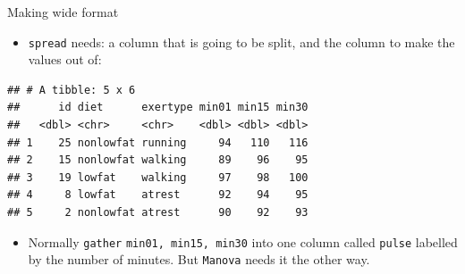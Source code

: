 \documentclass[ignorenonframetext,]{beamer}
\newenvironment{Shaded}{\begin{snugshade}}{\end{snugshade}}
\newcommand{\DecValTok}[1]{\textcolor[rgb]{0.00,0.00,0.81}{#1}}
\newcommand{\KeywordTok}[1]{\textcolor[rgb]{0.13,0.29,0.53}{\textbf{#1}}}
\newcommand{\NormalTok}[1]{#1}
\newcommand{\OperatorTok}[1]{\textcolor[rgb]{0.81,0.36,0.00}{\textbf{#1}}}
\newcommand{\StringTok}[1]{\textcolor[rgb]{0.31,0.60,0.02}{#1}}
\providecommand{\tightlist}{%
  \setlength{\itemsep}{0pt}\setlength{\parskip}{0pt}}
\begin{document}
\begin{frame}[fragile]{Making wide format}
\protect\hypertarget{making-wide-format}{}

\begin{itemize}
\tightlist
\item
  \texttt{spread} needs: a column that is going to be split, and the
  column to make the values out of:
\end{itemize}

\footnotesize

\begin{Shaded}
\end{Shaded}

\begin{verbatim}
## # A tibble: 5 x 6
##      id diet      exertype min01 min15 min30
##   <dbl> <chr>     <chr>    <dbl> <dbl> <dbl>
## 1    25 nonlowfat running     94   110   116
## 2    15 nonlowfat walking     89    96    95
## 3    19 lowfat    walking     97    98   100
## 4     8 lowfat    atrest      92    94    95
## 5     2 nonlowfat atrest      90    92    93
\end{verbatim}

\normalsize

\begin{itemize}
\tightlist
\item
  Normally \texttt{gather} \texttt{min01, min15,
  min30} into one column called \texttt{pulse} labelled by the number of
  minutes. But \texttt{Manova} needs it the other way.
\end{itemize}

\end{frame}
\end{document}
